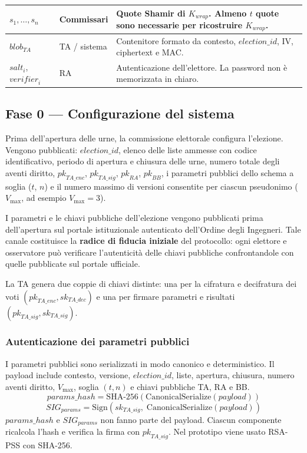 \documentclass[12pt,a4paper]{article}
\newcommand{\pk}{\mathit{pk}}
\newcommand{\sk}{\mathit{sk}}
\begin{document}
\begin{small}
\begin{longtable}{>{\raggedright}p{2.5cm} >{\raggedright}p{2.5cm} p{8cm}}
\midrule
$s_1, \ldots, s_n$ & Commissari &
Quote Shamir di $K_{\mathit{wrap}}$. Almeno $t$ quote sono necessarie per ricostruire $K_{\mathit{wrap}}$. \\
\midrule
$\mathit{blob}_{\mathit{TA}}$ & TA / sistema &
Contenitore formato da contesto, $\mathit{election\_id}$, IV, ciphertext e MAC. \\
\midrule
$\mathit{salt}_i$, $\mathit{verifier}_i$ & RA &
Autenticazione dell'elettore. La password non \`e memorizzata in chiaro. \\
\bottomrule
\end{longtable}
\end{small}

\subsection{Fase 0 --- Configurazione del sistema}

Prima dell'apertura delle urne, la commissione elettorale configura l'elezione. Vengono pubblicati: $\mathit{election\_id}$, elenco delle liste ammesse con codice identificativo, periodo di apertura e chiusura delle urne, numero totale degli aventi diritto, $\pk_{\mathit{TA\_enc}}$, $\pk_{\mathit{TA\_sig}}$, $\pk_{\mathit{RA}}$, $\pk_{\mathit{BB}}$, i parametri pubblici dello schema a soglia ($t$, $n$) e il numero massimo di versioni consentite per ciascun pseudonimo ($V_{\max}$, ad esempio $V_{\max} = 3$).

I parametri e le chiavi pubbliche dell'elezione vengono pubblicati prima dell'apertura sul portale istituzionale autenticato dell'Ordine degli Ingegneri. Tale canale costituisce la \textbf{radice di fiducia iniziale} del protocollo: ogni elettore e osservatore pu\`o verificare l'autenticit\`a delle chiavi pubbliche confrontandole con quelle pubblicate sul portale ufficiale.

La TA genera due coppie di chiavi distinte: una per la cifratura e decifratura dei voti $(\pk_{\mathit{TA\_enc}}, \sk_{\mathit{TA\_dec}})$ e una per firmare parametri e risultati $(\pk_{\mathit{TA\_sig}}, \sk_{\mathit{TA\_sig}})$.

\subsubsection*{Autenticazione dei parametri pubblici}

I parametri pubblici sono serializzati in modo canonico e deterministico. Il payload include contesto, versione, $\mathit{election\_id}$, liste, apertura, chiusura, numero aventi diritto, $V_{\max}$, soglia $(t,n)$ e chiavi pubbliche TA, RA e BB.
\[
\mathit{params\_hash} = \mathrm{SHA\mbox{-}256}(\mathrm{CanonicalSerialize}(\mathit{payload}))
\]
\[
\mathit{SIG}_{\mathit{params}} = \mathrm{Sign}(\sk_{\mathit{TA\_sig}},\; \mathrm{CanonicalSerialize}(\mathit{payload}))
\]
$\mathit{params\_hash}$ e $\mathit{SIG}_{\mathit{params}}$ non fanno parte del payload. Ciascun componente ricalcola l'hash e verifica la firma con $\pk_{\mathit{TA\_sig}}$. Nel prototipo viene usato RSA-PSS con SHA-256.
\end{document}
